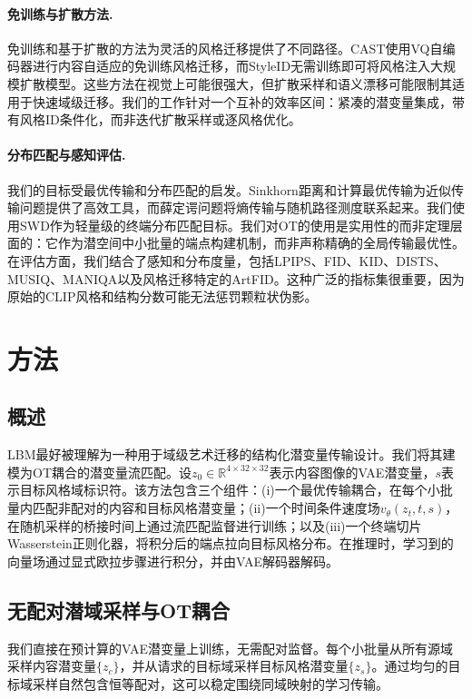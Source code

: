 ﻿\documentclass[letterpaper]{article}
\begin{document}
\paragraph{免训练与扩散方法.}
免训练和基于扩散的方法为灵活的风格迁移提供了不同路径。CAST使用VQ自编码器进行内容自适应的免训练风格迁移\cite{gim2024cast}，而StyleID无需训练即可将风格注入大规模扩散模型\cite{chung2024styleid}。这些方法在视觉上可能很强大，但扩散采样和语义漂移可能限制其适用于快速域级迁移。我们的工作针对一个互补的效率区间：紧凑的潜变量集成，带有风格ID条件化，而非迭代扩散采样或逐风格优化。

\paragraph{分布匹配与感知评估.}
我们的目标受最优传输和分布匹配的启发。Sinkhorn距离和计算最优传输为近似传输问题提供了高效工具\cite{cuturi2013sinkhorn,peyre2019computational}，而薛定谔问题将熵传输与随机路径测度联系起来\cite{leonard2014survey}。我们使用SWD作为轻量级的终端分布匹配目标。我们对OT的使用是实用性的而非定理层面的：它作为潜空间中小批量的端点构建机制，而非声称精确的全局传输最优性。在评估方面，我们结合了感知和分布度量，包括LPIPS\cite{zhang2018lpips}、FID\cite{heusel2017fid}、KID\cite{binkowski2018kid}、DISTS\cite{ding2020dists}、MUSIQ\cite{ke2021musiq}、MANIQA\cite{yang2022maniqa}以及风格迁移特定的ArtFID\cite{wright2022artfid}。这种广泛的指标集很重要，因为原始的CLIP风格和结构分数可能无法惩罚颗粒状伪影。

\section{方法}
\subsection{概述}
LBM最好被理解为一种用于域级艺术迁移的结构化潜变量传输设计。我们将其建模为OT耦合的潜变量流匹配。设$z_0 \in \mathbb{R}^{4 \times 32 \times 32}$表示内容图像的VAE潜变量，$s$表示目标风格域标识符。该方法包含三个组件：(i)一个最优传输耦合，在每个小批量内匹配非配对的内容和目标风格潜变量；(ii)一个时间条件速度场$v_\theta(z_t,t,s)$，在随机采样的桥接时间上通过流匹配监督进行训练；以及(iii)一个终端切片Wasserstein正则化器，将积分后的端点拉向目标风格分布。在推理时，学习到的向量场通过显式欧拉步骤进行积分，并由VAE解码器解码。

\subsection{无配对潜域采样与OT耦合}
我们直接在预计算的VAE潜变量上训练，无需配对监督。每个小批量从所有源域采样内容潜变量$\{z_c\}$，并从请求的目标域采样目标风格潜变量$\{z_s\}$。通过均匀的目标域采样自然包含恒等配对，这可以稳定围绕同域映射的学习传输。
\end{document}
